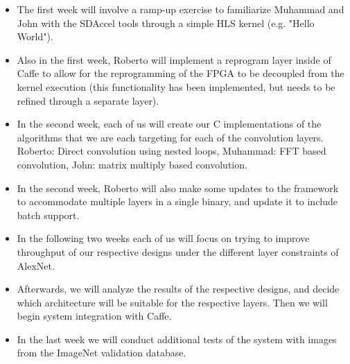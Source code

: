 \documentclass[conference,compsoc]{IEEEtran/IEEEtran}
\begin{document}
\begin{itemize}
    \item The first week will involve a ramp-up exercise to familiarize Muhammad and John with 
	the SDAccel tools through a simple HLS kernel (e.g. "Hello World"). 
    \item Also in the first week, Roberto will implement a reprogram layer inside of Caffe to 
	allow for the reprogramming of the FPGA to be decoupled from the kernel execution 
	(this functionality has been implemented, but needs to be refined through a separate layer). 
    \item In the second week, each of us will create our C implementations of the algorithms 
	that we are each targeting for each of the convolution layers. Roberto: Direct convolution 
	using nested loops, Muhammad: FFT based convolution, John: matrix multiply based convolution. 
	\item In the second week, Roberto will also make some updates to the framework to accommodate
	multiple layers in a single binary, and update it to include batch support. 
    \item In the following two weeks each of us will focus on trying to improve throughput of our 
	respective designs under the different layer constraints of AlexNet.
    \item Afterwards, we will analyze the results of the respective designs, and decide which 
	architecture will be suitable for the respective layers. Then we will begin system integration 
	with Caffe.
    \item In the last week we will conduct additional tests of the system with images from the 
	ImageNet validation database. 
\end{itemize}




\end{document}
